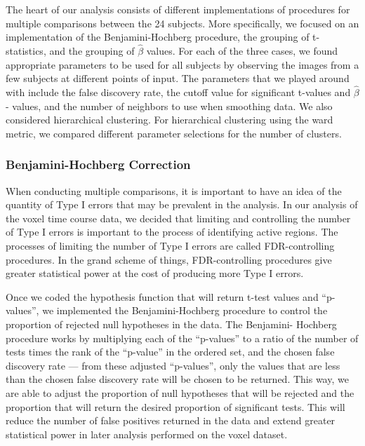 \par The heart of our analysis consists of different implementations of 
procedures for multiple comparisons between the 24 subjects. More 
specifically, we focused on an implementation of the Benjamini-Hochberg 
procedure, the grouping of t-statistics, and the grouping of $\hat{\beta}$ 
values. For each of the three cases, we found appropriate parameters to be 
used for all subjects by observing the images from a few subjects at different 
points of input. The parameters that we played around with include the false 
discovery rate, the cutoff value for significant t-values and $\hat{\beta}$-
values, and the number of neighbors to use when smoothing data. We also 
considered hierarchical clustering. For hierarchical clustering using the 
ward metric, we compared different parameter selections for the number of 
clusters.

\subsubsection{Benjamini-Hochberg Correction}

\par When conducting multiple comparisons, it is important to have an 
idea of the quantity of Type I errors that may be prevalent in the analysis. 
In our analysis of the voxel time course data, we decided that limiting and 
controlling the number of Type I errors is important to the process of 
identifying active regions. The processes of limiting the number of Type I 
errors are called FDR-controlling procedures. In the grand scheme of things, 
FDR-controlling procedures give greater statistical power at the cost of 
producing more Type I errors.  

\par Once we coded the hypothesis function that will return t-test 
values and ``p-values'', we implemented the Benjamini-Hochberg procedure to 
control the proportion of rejected null hypotheses in the data. The Benjamini-
Hochberg procedure works by multiplying each of the ``p-values'' to a ratio of 
the number of tests times the rank of the ``p-value'' in the ordered set, 
and the chosen false discovery rate --- from these adjusted ``p-values'', only 
the values that are less than the chosen false discovery rate will be chosen 
to be returned. This way, we are able to adjust the proportion of null 
hypotheses that will be rejected and the proportion that will return the 
desired proportion of significant tests. This will reduce the
number of false positives returned in the data and extend greater statistical 
power in later analysis performed on the voxel dataset.

